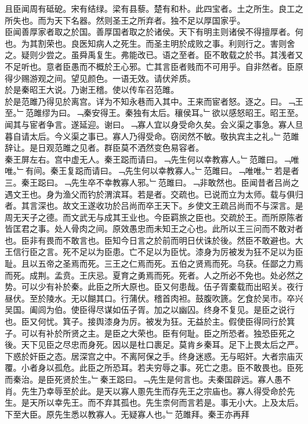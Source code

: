 \documentclass{zhvt-classic}
\begin{document}
\hspace*{2em}且臣闻周有砥砨。宋有结绿。梁有县藜。楚有和朴。此四宝者。土之所生。良工之所失也。而为天下名器。然则圣王之所弃者。独不足以厚国家乎。\\
\hspace*{2em}臣闻善厚家者取之於国。善厚国者取之於诸侯。天下有明主则诸侯不得擅厚者。何也。为其割荣也。良医知病人之死生。而圣主明於成败之事。利则行之。害则舍之。疑则少尝之。虽舜禹复生。弗能改已。语之至者。臣不敢载之於书。其浅者又不足听也。意者臣愚而不概於王心邪。亡其言臣者贱而不可用乎。自非然者。臣原得少赐游观之间。望见颜色。一语无效。请伏斧质。\\
\hspace*{2em}於是秦昭王大说。乃谢王稽。使以传车召范雎。\\
\hspace*{2em}於是范雎乃得见於离宫。详为不知永巷而入其中。王来而宦者怒。逐之。曰。﹁王至。﹂范雎缪为曰。﹁秦安得王。秦独有太后。穰侯耳。﹂欲以感怒昭王。昭王至。闻其与宦者争言。遂延迎。谢曰。﹁寡人宜以身受命久矣。会义渠之事急。寡人旦暮自请太后。今义渠之事已。寡人乃得受命。窃闵然不敏。敬执宾主之礼。﹂范雎辞让。是日观范雎之见者。群臣莫不洒然变色易容者。\\
\hspace*{2em}秦王屏左右。宫中虚无人。秦王跽而请曰。﹁先生何以幸教寡人。﹂范雎曰。﹁唯唯。﹂有间。秦王复跽而请曰。﹁先生何以幸教寡人。﹂范雎曰。﹁唯唯。﹂若是者三。秦王跽曰。﹁先生卒不幸教寡人邪。﹂范雎曰。﹁非敢然也。臣闻昔者吕尚之遇文王也。身为渔父而钓於渭滨耳。若是者。交疏也。已说而立为太师。载与俱归者。其言深也。故文王遂收功於吕尚而卒王天下。乡使文王疏吕尚而不与深言。是周无天子之德。而文武无与成其王业也。今臣羁旅之臣也。交疏於王。而所原陈者皆匡君之事。处人骨肉之间。原效愚忠而未知王之心也。此所以王三问而不敢对者也。臣非有畏而不敢言也。臣知今日言之於前而明日伏诛於後。然臣不敢避也。大王信行臣之言。死不足以为臣患。亡不足以为臣忧。漆身为厉被发为狂不足以为臣耻。且以五帝之圣焉而死。三王之仁焉而死。五伯之贤焉而死。乌获。任鄙之力焉而死。成荆。孟贲。王庆忌。夏育之勇焉而死。死者。人之所必不免也。处必然之势。可以少有补於秦。此臣之所大原也。臣又何患哉。伍子胥橐载而出昭关。夜行昼伏。至於陵水。无以餬其口。行蒲伏。稽首肉袒。鼓腹吹篪。乞食於吴市。卒兴吴国。阖闾为伯。使臣得尽谋如伍子胥。加之以幽囚。终身不复见。是臣之说行也。臣又何忧。箕子。接舆漆身为厉。被发为狂。无益於主。假使臣得同行於箕子。可以有补於所贤之主。是臣之大荣也。臣有何耻。臣之所恐者。独恐臣死之後。天下见臣之尽忠而身死。因以是杜口裹足。莫肯乡秦耳。足下上畏太后之严。下惑於奸臣之态。居深宫之中。不离阿保之手。终身迷惑。无与昭奸。大者宗庙灭覆。小者身以孤危。此臣之所恐耳。若夫穷辱之事。死亡之患。臣不敢畏也。臣死而秦治。是臣死贤於生。﹂秦王跽曰。﹁先生是何言也。夫秦国辟远。寡人愚不肖。先生乃幸辱至於此。是天以寡人慁先生而存先王之宗庙也。寡人得受命於先生。是天所以幸先王。而不弃其孤也。先生柰何而言若是。事无小大。上及太后。下至大臣。原先生悉以教寡人。无疑寡人也。﹂范雎拜。秦王亦再拜\\
\end{document}
